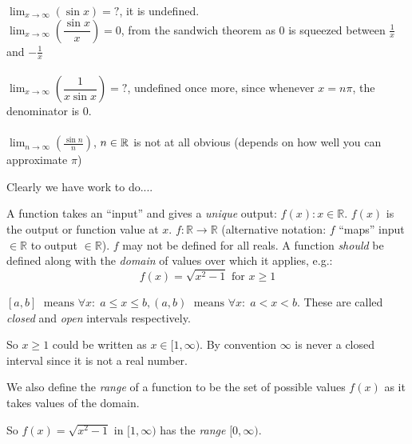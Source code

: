 \documentclass[twoside]{scrartcl}
\begin{document}
\begin{example}[Limits]

$\displaystyle{\lim_{x \to \infty} (\sin x) = ? }$, it is undefined.\\

$\displaystyle{\lim_{x \to \infty} \left(\dfrac{\sin x}{x}\right) }= 0 $, from the sandwich theorem as 0 is squeezed between $\frac{1}{x}$ and $-\frac{1}{x}$\\\\

$\displaystyle{\lim_{x \to \infty} \left(\dfrac{1}{x\sin x}\right) = ? }$, undefined once more, since whenever $x = n\pi$, the denominator is 0.\\\\

$\displaystyle{\lim_{n \to \infty} \left(\frac{\sin n}{n}\right) }$, $n \in \mathbb{R}$ is not at all obvious (depends on how well you can approximate $\pi$)
\end{example}\vspace*{5pt}

Clearly we have work to do....




\pagebreak


A function  
 takes an ``input'' and gives a \emph{unique} output: $f(x) : x \in \mathbb{R}.$ $f(x)$ is the output or function value at $x$. $f:\mathbb{R} \rightarrow \mathbb{R}$ (alternative notation: $f$ ``maps'' input $\in \mathbb{R}$ to output $\in \mathbb{R}$). $f$ may not be defined for all reals. A function \textit{should} be defined along with the \emph{domain} of values over which it applies, e.g.:
\[f(x) = \sqrt{x^2 -1}\text{ for } x \geq 1\]

\begin{definition}
	 $[a,b] \; \text{ means } \forall x : \; a \leq x \leq b, (a,b) \; \text{ means } \forall x : \; a < x < b$.
These are called \emph{closed} and \emph{open} intervals respectively. 

\end{definition}


So $x \geq 1$ could be written as $x \in [1,\infty)$. By convention $\infty$ is never a closed interval since it is not a real number.\\

\begin{definition}
We also define the \emph{range} of a function to be the set of possible values $f(x)$ as it takes values of the domain.
\end{definition}
So $f(x) = \sqrt{x^2 -1 }$ in $[1,\infty)$ has the \emph{range} $[0,\infty)$.\\
\end{document}
